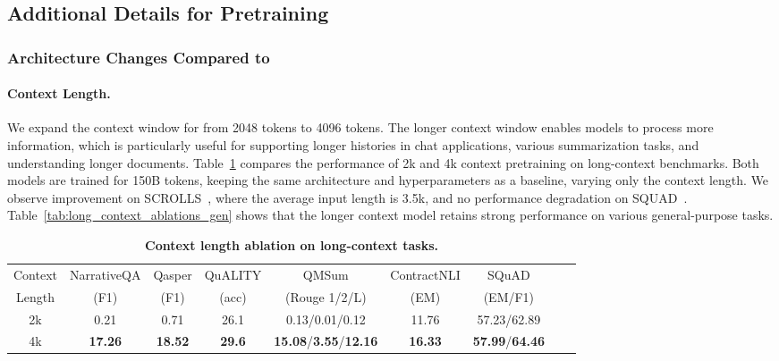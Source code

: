 \subsection{Additional Details for Pretraining}
\label{sec:appendix_pretrain_details}

\subsubsection{Architecture Changes Compared to \anise}
\label{sec:appendix_pretrain_details_archi_changes}

\paragraph{Context Length.} 
\label{sec:app_ctx_len}

We expand the context window for \cinnamon from 2048 tokens to 4096 tokens. 
The longer context window enables models to process more information, which is particularly useful for supporting longer histories in chat applications, various summarization tasks, and understanding longer documents.
Table~\ref{tab:long_context_ablations} compares the performance of 2k and 4k context pretraining on long-context benchmarks. Both models are trained for 150B tokens, keeping the same architecture and hyperparameters as a baseline, varying only the context length. We observe improvement on SCROLLS~\citep{shaham-etal-2022-scrolls}, where the average input length is 3.5k, and no performance degradation on SQUAD~\citep{rajpurkar2018know}. Table~\ref{tab:long_context_ablations_gen} shows that the longer context model retains strong performance on various general-purpose tasks.

\begin{table}[b!]
    \small
    \centering
    \setlength{\tabcolsep}{3pt} 
    \begin{tabular}{ccccccccc}
    \toprule
    Context & NarrativeQA & Qasper & QuALITY & QMSum & ContractNLI  & SQuAD \\
    Length & (F1) & (F1) & (acc) & (Rouge 1/2/L)  & (EM)  & (EM/F1) \\
    \midrule
    \midrule
       2k & 0.21 & 0.71 & 26.1 & 0.13/0.01/0.12 & 11.76  & 57.23/62.89  \\
       4k & \textbf{17.26} & \textbf{18.52} & \textbf{29.6} & \textbf{15.08}/\textbf{3.55}/\textbf{12.16} & \textbf{16.33}  & \textbf{57.99}/\textbf{64.46} \\
    \bottomrule
    \end{tabular}
    \caption{
    \textbf{Context length ablation on long-context tasks.}
    \label{tab:long_context_ablations}
    }
  \end{table}

